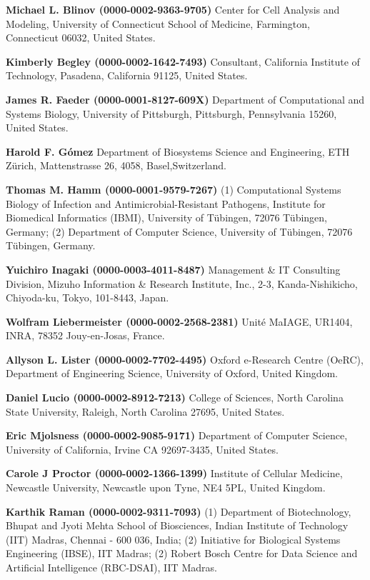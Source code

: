 \documentclass{sbml-paper}
\begin{document}
\textbf{Michael L. Blinov (0000-0002-9363-9705)} Center for Cell Analysis and Modeling, University of Connecticut School of Medicine, Farmington, Connecticut 06032, United States.

\textbf{Kimberly Begley (0000-0002-1642-7493)} Consultant, California Institute of Technology, Pasadena, California 91125, United States.

\textbf{James R. Faeder (0000-0001-8127-609X)} Department of Computational and Systems Biology, University of Pittsburgh, Pittsburgh, Pennsylvania 15260, United States.

\textbf{Harold F. Gómez} Department of Biosystems Science and Engineering, ETH Zürich, Mattenstrasse 26, 4058, Basel,Switzerland.

\textbf{Thomas M. Hamm (0000-0001-9579-7267)} (1) Computational Systems Biology of Infection and Antimicrobial-Resistant Pathogens, Institute for Biomedical Informatics (IBMI), University of Tübingen, 72076 Tübingen, Germany; (2) Department of Computer Science, University of Tübingen, 72076 Tübingen, Germany.

\textbf{Yuichiro Inagaki (0000-0003-4011-8487)} Management & IT Consulting Division, Mizuho Information & Research Institute, Inc., 2-3, Kanda-Nishikicho, Chiyoda-ku, Tokyo, 101-8443, Japan.

\textbf{Wolfram Liebermeister (0000-0002-2568-2381)} Unité MaIAGE, UR1404, INRA, 78352 Jouy-en-Josas, France.

\textbf{Allyson L. Lister (0000-0002-7702-4495)} Oxford e-Research Centre (OeRC), Department of Engineering Science, University of Oxford, United Kingdom.

\textbf{Daniel Lucio (0000-0002-8912-7213)} College of Sciences, North Carolina State University, Raleigh, North Carolina 27695, United States.

\textbf{Eric Mjolsness (0000-0002-9085-9171)} Department of Computer Science, University of California, Irvine CA 92697-3435, United States.

\textbf{Carole J Proctor (0000-0002-1366-1399)} Institute of Cellular Medicine, Newcastle University, Newcastle upon Tyne, NE4 5PL, United Kingdom.

\textbf{Karthik Raman (0000-0002-9311-7093)} (1) Department of Biotechnology, Bhupat and Jyoti Mehta School of Biosciences, Indian Institute of Technology (IIT) Madras, Chennai - 600 036, India; (2) Initiative for Biological Systems Engineering (IBSE), IIT Madras; (2) Robert Bosch Centre for Data Science and Artificial Intelligence (RBC-DSAI), IIT Madras.
\end{document}

